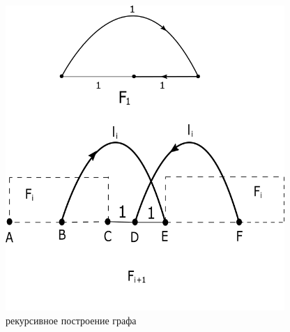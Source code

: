 \documentclass[a4paper, 14pt]{extarticle}
\numberwithin{equation}{section}
\begin{document}
\begin{figure}[h!]
\begin{center}
\includegraphics[width=300pt]{ris1.png}
\caption{рекурсивное построение графа}
\label{fig:recursiveGraph}
\end{center}
\end{figure}
\end{document}
